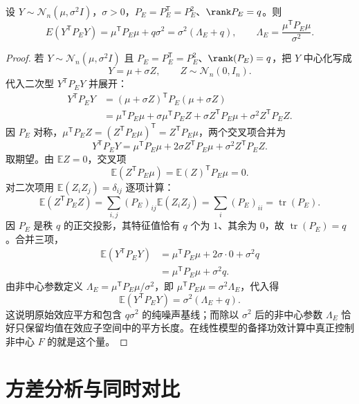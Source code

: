 \begin{proposition}[效应平方和的噪声基线]
设 $Y\sim\mathcal N_n(\mu,\sigma^2I)$，$\sigma>0$，$P_E=P_E^{\mathsf T}=P_E^2$、$\rank P_E=q$。则
\[
E(Y^{\mathsf T}P_EY)=\mu^{\mathsf T}P_E\mu+q\sigma^2
=\sigma^2(\Lambda_E+q),\qquad\Lambda_E=\frac{\mu^{\mathsf T}P_E\mu}{\sigma^2}.
\]
\end{proposition}
\begin{proof}
若 $Y\sim\mathcal N_n(\mu,\sigma^2I)$ 且 $P_E=P_E^{\mathsf T}=P_E^2$、$\rank(P_E)=q$，把 $Y$ 中心化写成
\[
 Y=\mu+\sigma Z,
 \qquad
 Z\sim\mathcal N_n(0,I_n).
\]
代入二次型 $Y^{\mathsf T}P_EY$ 并展开：
\begin{align*}
Y^{\mathsf T}P_EY
&=(\mu+\sigma Z)^{\mathsf T}P_E(\mu+\sigma Z)\\
&=\mu^{\mathsf T}P_E\mu
 +\sigma\mu^{\mathsf T}P_EZ
 +\sigma Z^{\mathsf T}P_E\mu
 +\sigma^2 Z^{\mathsf T}P_EZ.
\end{align*}
因 $P_E$ 对称，$\mu^{\mathsf T}P_EZ=(Z^{\mathsf T}P_E\mu)^{\mathsf T}=Z^{\mathsf T}P_E\mu$，两个交叉项合并为
\[
Y^{\mathsf T}P_EY
=\mu^{\mathsf T}P_E\mu
+2\sigma Z^{\mathsf T}P_E\mu
+\sigma^2 Z^{\mathsf T}P_EZ.
\]
取期望。由 $\mathbb E Z=0$，交叉项
\[
\mathbb E(Z^{\mathsf T}P_E\mu)=\mathbb E(Z)^{\mathsf T}P_E\mu=0.
\]
对二次项用 $\mathbb E(Z_iZ_j)=\delta_{ij}$ 逐项计算：
\[
\mathbb E(Z^{\mathsf T}P_EZ)
=\sum_{i,j}(P_E)_{ij}\mathbb E(Z_iZ_j)
=\sum_i(P_E)_{ii}
=\operatorname{tr}(P_E).
\]
因 $P_E$ 是秩 $q$ 的正交投影，其特征值恰有 $q$ 个为 $1$、其余为 $0$，故 $\operatorname{tr}(P_E)=q$。合并三项，
\begin{align*}
\mathbb E(Y^{\mathsf T}P_EY)
&=\mu^{\mathsf T}P_E\mu
 +2\sigma\cdot 0
 +\sigma^2 q\\
&=\mu^{\mathsf T}P_E\mu+\sigma^2 q.
\end{align*}
由非中心参数定义 $\Lambda_E=\mu^{\mathsf T}P_E\mu/\sigma^2$，即 $\mu^{\mathsf T}P_E\mu=\sigma^2\Lambda_E$，代入得
\[
\mathbb E(Y^{\mathsf T}P_EY)=\sigma^2(\Lambda_E+q).
\]
这说明原始效应平方和包含 $q\sigma^2$ 的纯噪声基线；而除以 $\sigma^2$ 后的非中心参数 $\Lambda_E$ 恰好只保留均值在效应子空间中的平方长度。在线性模型的备择功效计算中真正控制非中心 $F$ 的就是这个量。
\end{proof}


\section{方差分析与同时对比}

